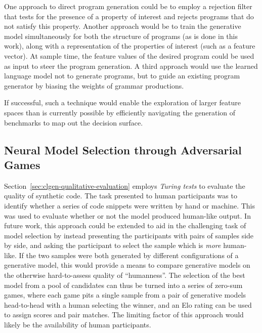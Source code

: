 One approach to direct program generation could be to employ a rejection filter that tests for the presence of a property of interest and rejects programs that do not satisfy this property. Another approach would be to train the generative model simultaneously for both the structure of programs (as is done in this work), along with a representation of the properties of interest (such as a feature vector). At sample time, the feature values of the desired program could be used as input to steer the program generation. A third approach would use the learned language model not to generate programs, but to guide an existing program generator by biasing the weights of grammar productions.

If successful, such a technique would enable the exploration of larger feature spaces than is currently possible by efficiently navigating the generation of benchmarks to map out the decision surface. 


\subsection{Neural Model Selection through Adversarial Games}

Section~\ref{sec:clgen-qualitative-evaluation} employs \emph{Turing tests} to evaluate the quality of synthetic code. The task presented to human participants was to identify whether a series of code snippets were written by hand or machine. This was used to evaluate whether or not the model produced human-like output. In future work, this approach could be extended to aid in the challenging task of model selection by instead presenting the participants with pairs of samples side by side, and asking the participant to select the sample which is \emph{more} human-like. If the two samples were both generated by different configurations of a generative model, this would provide a means to compare generative models on the otherwise hard-to-assess quality of ``humanness''. The selection of the best model from a pool of candidates can thus be turned into a series of zero-sum games, where each game pits a single sample from a pair of generative models head-to-head with a human selecting the winner, and an Elo rating can be used to assign scores and pair matches. The limiting factor of this approach would likely be the availability of human participants.

